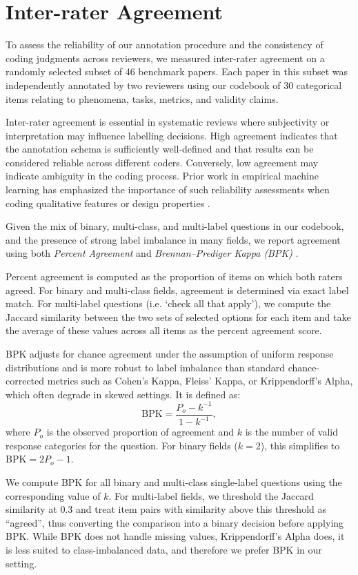 \clearpage
\section{Inter-rater Agreement} \label{app:validation}

To assess the reliability of our annotation procedure and the consistency of coding judgments across reviewers, we measured inter-rater agreement on a randomly selected subset of 46 benchmark papers. Each paper in this subset was independently annotated by two reviewers using our codebook of 30 categorical items relating to phenomena, tasks, metrics, and validity claims.

Inter-rater agreement is essential in systematic reviews where subjectivity or interpretation may influence labelling decisions. High agreement indicates that the annotation schema is sufficiently well-defined and that results can be considered reliable across different coders. Conversely, low agreement may indicate ambiguity in the coding process. Prior work in empirical machine learning has emphasized the importance of such reliability assessments when coding qualitative features or design properties \cite{artstein2008inter, geiger2020garbage}.

Given the mix of binary, multi-class, and multi-label questions in our codebook, and the presence of strong label imbalance in many fields, we report agreement using both \textit{Percent Agreement} and \textit{Brennan–Prediger Kappa (BPK)} \cite{bpkappa}.

Percent agreement is computed as the proportion of items on which both raters agreed. For binary and multi-class fields, agreement is determined via exact label match. For multi-label questions (i.e. `check all that apply'), we compute the Jaccard similarity between the two sets of selected options for each item and take the average of these values across all items as the percent agreement score.

BPK adjusts for chance agreement under the assumption of uniform response distributions and is more robust to label imbalance than standard chance-corrected metrics such as Cohen’s Kappa, Fleiss’ Kappa, or Krippendorff’s Alpha, which often degrade in skewed settings. It is defined as:
\[
\text{BPK} = \dfrac{P_o - k^{-1}}{1 - k^{-1}},
\]
where \( P_o \) is the observed proportion of agreement and \( k \) is the number of valid response categories for the question. For binary fields (\(k = 2\)), this simplifies to $\text{BPK} = 2P_o - 1$. 

We compute BPK for all binary and multi-class single-label questions using the corresponding value of \(k\). For multi-label fields, we threshold the Jaccard similarity at 0.3 and treat item pairs with similarity above this threshold as “agreed”, thus converting the comparison into a binary decision before applying BPK. While BPK does not handle missing values, Krippendorff’s Alpha does, it is less suited to class-imbalanced data, and therefore we prefer BPK in our setting.

